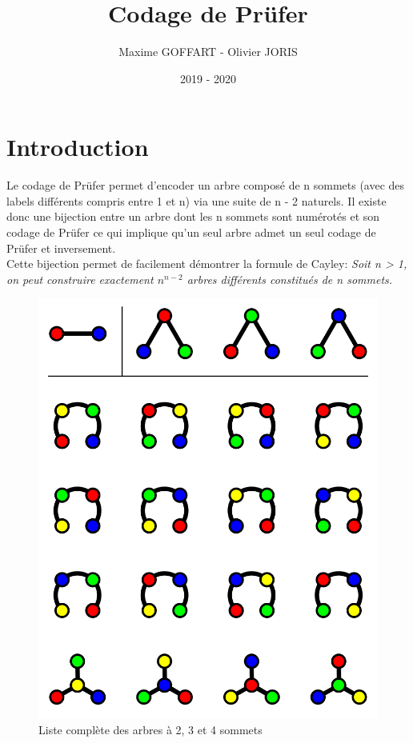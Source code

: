 \documentclass[a4paper, 11pt, oneside]{article}
\title{Codage de Prüfer}
\author{Maxime GOFFART - Olivier JORIS}
\date{2019 - 2020}
\begin{document}
\maketitle
\newpage

\tableofcontents
\newpage

\section{Introduction}

Le codage de Prüfer permet d'encoder un arbre composé de n sommets (avec des labels différents compris entre 1 et n) via une suite de n - 2 naturels. Il existe donc une bijection entre un arbre dont les n sommets sont numérotés et son codage de Prüfer ce qui implique qu'un seul arbre admet un seul codage de Prüfer et inversement.\\

Cette bijection permet de facilement démontrer la formule de Cayley:
\textit{Soit n > 1, on peut construire exactement $n^{n-2}$ arbres différents constitués de n sommets.}

\begin{figure}[H]
	\centering
	\includegraphics[scale=0.2]{formule_Cayley.png} 
	\caption{Liste complète des arbres à 2, 3 et 4 sommets\protect\footnotemark}
\end{figure}
\end{document}

